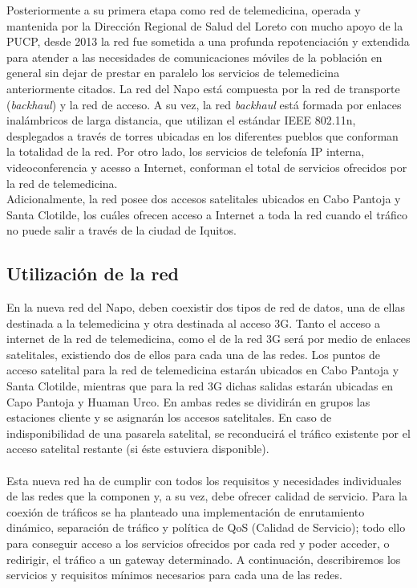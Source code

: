 	 Posteriormente a su primera etapa como red de telemedicina, operada y mantenida por la Dirección Regional de Salud del Loreto con mucho apoyo de la PUCP, desde 2013 la red fue sometida a una profunda repotenciación y extendida para atender a las necesidades de comunicaciones móviles de la población en general sin dejar de prestar en paralelo los servicios de telemedicina anteriormente citados. La red del Napo está compuesta por la red de transporte (\textit{backhaul}) y la red de acceso. A su vez, la red \textit{backhaul} está formada por enlaces inalámbricos de larga distancia, que utilizan el estándar IEEE 802.11n, desplegados a través de torres ubicadas en los diferentes pueblos que conforman la totalidad de la red. Por otro lado, los servicios de telefonía IP interna, videoconferencia y acesso a Internet,  conforman el total de servicios ofrecidos por la red de telemedicina.\\
	Adicionalmente, la red posee dos accesos satelitales ubicados en Cabo Pantoja y Santa Clotilde, los cuáles ofrecen acceso a Internet a toda la red cuando el tráfico no puede salir a través de la ciudad de Iquitos.
	
	\subsection{Utilización de la red}
	En la nueva red del Napo, deben coexistir dos tipos de red de datos, una de ellas destinada a la telemedicina y otra destinada al acceso 3G. Tanto el acceso a internet de la red de telemedicina, como el de la red 3G será por medio de enlaces satelitales, existiendo dos de ellos para cada una de las redes. Los puntos de acceso satelital para la red de telemedicina estarán ubicados en Cabo Pantoja y Santa Clotilde, mientras que para la red 3G dichas salidas estarán ubicadas en Capo Pantoja y Huaman Urco. En ambas redes se dividirán en grupos las estaciones cliente y se asignarán los accesos satelitales. En caso de indisponibilidad de una pasarela satelital, se reconducirá el tráfico existente por el acceso satelital restante (si éste estuviera disponible).\\\\
	
	Esta nueva red ha de cumplir con todos los requisitos y necesidades individuales de las redes que la componen y, a su vez, debe ofrecer calidad de servicio. Para la coexión de tráficos se ha planteado una implementación de enrutamiento dinámico, separación de tráfico y política de QoS (Calidad de Servicio); todo ello para conseguir acceso a los servicios ofrecidos por cada red y poder acceder, o redirigir, el tráfico a un gateway determinado. A continuación, describiremos los servicios y requisitos mínimos necesarios para cada una de las redes.\\\\
	
